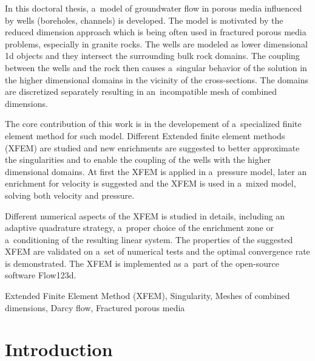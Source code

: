 \documentclass[bibliography=totocnumbered,dvipsnames,FM,Dis, EN]{tulthesis_autoreferat}
\begin{document}
\begin{abstractEN}
In this doctoral thesis, a~model of groundwater flow in porous media influenced by wells (boreholes, channels) is developed.
The model is motivated by the reduced dimension approach which is being often used in fractured porous media problems, especially in granite rocks.
The wells are modeled as lower dimensional 1d objects and they intersect the surrounding bulk rock domains.
The coupling between the wells and the rock then causes a~singular behavior of the solution in the higher dimensional domains
in the vicinity of the cross-sections. The domains are discretized separately resulting in an~incompatible mesh of combined dimensions.

The core contribution of this work is in the developement of a~specialized finite element method for such model.
Different Extended finite element methods (XFEM) are studied and new enrichments are suggested to better
approximate the singularities and to enable the coupling of the wells with the higher dimensional domains.
At first the XFEM is applied in a~pressure model, later an enrichment for velocity
is suggested and the XFEM is used in a~mixed model, solving both velocity and pressure.

Different numerical aspects of the XFEM is studied in details, including an adaptive quadrature strategy,
a~proper choice of the enrichment zone or a~conditioning of the resulting linear system.
The properties of the suggested XFEM are validated on a~set of numerical tests and the optimal convergence
rate is demonstrated. The XFEM is implemented as a~part of the open-source software Flow123d.

\end{abstractEN}

\begin{keywordsEN}
Extended Finite Element Method (XFEM), Singularity, Meshes of combined dimensions,
Darcy flow, Fractured porous media
\end{keywordsEN}

\clearpage

\tableofcontents
\clearpage



\chapter{Introduction}

\end{document}

